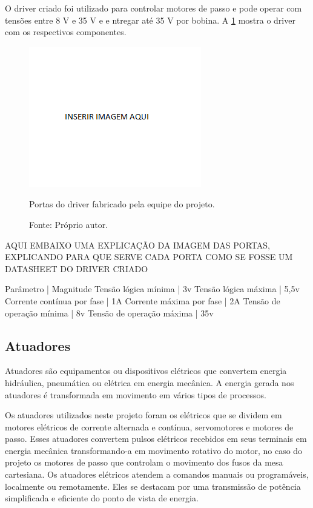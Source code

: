 O driver criado foi utilizado para controlar motores de passo e pode operar com tensões entre 8 V e 35 V e e
ntregar até 35 V por bobina. A \ref{figdriverportas} mostra o driver com os respectivos componentes.

\begin{figure}[!htb]
\centering
\includegraphics[scale = 0.2]{figuras/3-14}
\caption{Portas do driver fabricado pela equipe do projeto.}
\caption*{Fonte: Próprio autor.}
\label{figdriverportas}
\end{figure}
    
AQUI EMBAIXO UMA EXPLICAÇÃO DA IMAGEM DAS PORTAS, EXPLICANDO PARA QUE SERVE CADA PORTA COMO SE FOSSE UM DATASHEET 
DO DRIVER CRIADO


Parâmetro | Magnitude
Tensão lógica mínima | 3v
Tensão lógica máxima | 5,5v
Corrente contínua por fase | 1A
Corrente máxima por fase | 2A
Tensão de operação mínima | 8v
Tensão de operação máxima | 35v

\subsection{Atuadores}

Atuadores são equipamentos ou dispositivos elétricos que convertem energia hidráulica, pneumática ou elétrica em energia 
mecânica. A energia gerada nos atuadores é transformada em movimento em vários tipos de processos.

Os atuadores utilizados neste projeto foram os elétricos que se dividem em  motores elétricos de corrente alternada 
e contínua, servomotores e motores de passo. Esses atuadores convertem pulsos elétricos recebidos em seus terminais 
em energia mecânica transformando-a em movimento rotativo do motor, no caso do projeto os motores de passo que controlam 
o movimento dos fusos da mesa cartesiana. Os atuadores elétricos atendem a comandos manuais ou programáveis, localmente 
ou remotamente. Eles se destacam por uma transmissão de potência simplificada e eficiente do ponto de vista de energia.

